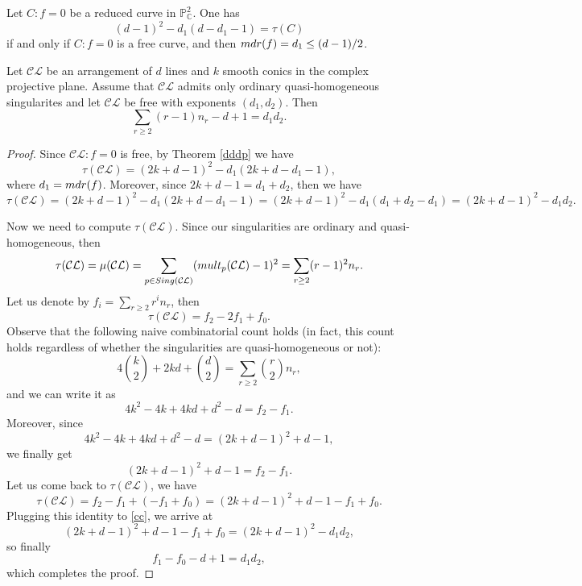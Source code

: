 \documentclass[10pt,a4paper]{amsart}
\begin{document}
\begin{theorem}
\label{dddp}
Let $C : f=0$ be a reduced curve in $\mathbb{P}^{2}_{\mathbb{C}}$. One has
\begin{equation}
\label{duPles}
(d-1)^{2} - d_{1}(d-d_{1}-1) = \tau(C)
\end{equation}
if and only if $C : f=0 $ is a free curve, and then ${\rm mdr}(f) = d_{1} \leq (d-1)/2$.
\end{theorem}

\begin{proposition}
\label{ccc}
Let $\mathcal{CL}$ be an arrangement of $d$ lines and $k$ smooth conics in the complex projective plane. Assume that $\mathcal{CL}$ admits only ordinary quasi-homogeneous singularites and let $\mathcal{CL}$ be free with exponents $(d_{1}, d_{2})$. Then
\begin{equation}
\sum_{r\geq 2}(r-1)n_{r} - d + 1 = d_{1}d_{2}.
\end{equation}
\end{proposition} 

\begin{proof}
Since $\mathcal{CL} : f = 0$ is free, by Theorem \ref{dddp} we have 
\begin{equation}
\label{cc}
\tau(\mathcal{CL}) = (2k+d-1)^{2} - d_{1}(2k+d-d_{1}-1),
\end{equation}
where $d_{1} = {\rm mdr}(f)$. Moreover, since $2k+d - 1 = d_{1}+d_{2}$, then we have
$$\tau(\mathcal{CL}) = (2k+d-1)^{2} - d_{1}(2k+d-d_{1}-1) = (2k+d-1)^{2} - d_{1}(d_{1}+d_{2}-d_{1}) = (2k+d-1)^{2} - d_{1}d_{2}.$$

Now we need to compute $\tau(\mathcal{CL})$. Since our singularities are ordinary and quasi-homogeneous, then
$$\tau(\mathcal{CL}) = \mu(\mathcal{CL}) = \sum_{p \in {\rm Sing}(\mathcal{CL})}({\rm mult}_{p}(\mathcal{CL})-1)^{2} = \sum_{r\geq 2}(r-1)^{2}n_{r}.$$
Let us denote by $f_{i} = \sum_{r\geq 2}r^{i}n_{r}$, then
$$\tau(\mathcal{CL}) = f_{2}-2f_{1} + f_{0}.$$
Observe that the following naive combinatorial count holds (in fact, this count holds regardless of whether the singularities are quasi-homogeneous or not):
$$4\binom{k}{2} + 2kd + \binom{d}{2} = \sum_{r\geq 2}\binom{r}{2}n_{r},$$
and we can write it as 
$$4k^{2}-4k + 4kd + d^{2} - d = f_{2}-f_{1}.$$
Moreover, since 
$$4k^{2}-4k + 4kd + d^{2} - d =(2k+d-1)^{2} + d - 1,$$
we finally get
$$(2k+d-1)^{2} + d - 1 = f_{2} - f_{1}.$$
Let us come back to $\tau(\mathcal{CL})$, we have
$$\tau(\mathcal{CL}) = f_{2} - f_{1} + (-f_{1}+f_{0}) = (2k+d-1)^{2} + d - 1 - f_{1}+f_{0}.$$
Plugging this identity to \eqref{cc}, we arrive at
$$(2k+d-1)^{2} + d - 1 - f_{1}+f_{0} = (2k+d-1)^{2} - d_{1}d_{2},$$
so finally
$$f_{1} - f_{0} - d + 1 = d_{1}d_{2},$$
which completes the proof.
\end{proof}
\end{document}
